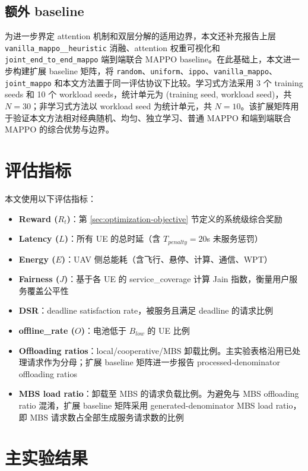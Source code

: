 \subsection{额外 baseline}

为进一步界定 attention 机制和双层分解的适用边界，本文还补充报告上层 \texttt{vanilla\_mappo\_\_heuristic} 消融、attention 权重可视化和 \texttt{joint\_end\_to\_end\_mappo} 端到端联合 MAPPO baseline。在此基础上，本文进一步构建扩展 baseline 矩阵，将 \texttt{random}、\texttt{uniform}、\texttt{ippo}、\texttt{vanilla\_mappo}、\texttt{joint\_mappo} 和本文方法置于同一评估协议下比较。学习式方法采用 3 个 training seeds 和 10 个 workload seeds，统计单元为 (training seed, workload seed)，共 $N=30$；非学习式方法以 workload seed 为统计单元，共 $N=10$。该扩展矩阵用于验证本文方法相对经典随机、均匀、独立学习、普通 MAPPO 和端到端联合 MAPPO 的综合优势与边界。

\section{评估指标}
\label{sec:metrics}

本文使用以下评估指标：

\begin{itemize}
    \item \textbf{Reward ($R_t$)}：第 \ref{sec:optimization-objective} 节定义的系统级综合奖励
    \item \textbf{Latency ($L$)}：所有 UE 的总时延（含 $T_{penalty}=20$s 未服务惩罚）
    \item \textbf{Energy ($E$)}：UAV 侧总能耗（含飞行、悬停、计算、通信、WPT）
    \item \textbf{Fairness ($J$)}：基于各 UE 的 service\_coverage 计算 Jain 指数，衡量用户服务覆盖公平性
    \item \textbf{DSR}：deadline satisfaction rate，被服务且满足 deadline 的请求比例
    \item \textbf{offline\_rate ($O$)}：电池低于 $B_{low}$ 的 UE 比例
    \item \textbf{Offloading ratios}：local/cooperative/MBS 卸载比例。主实验表格沿用已处理请求作为分母；扩展 baseline 矩阵进一步报告 processed-denominator offloading ratios
    \item \textbf{MBS load ratio}：卸载至 MBS 的请求负载比例。为避免与 MBS offloading ratio 混淆，扩展 baseline 矩阵采用 generated-denominator MBS load ratio，即 MBS 请求数占全部生成服务请求数的比例
\end{itemize}

\section{主实验结果}
\label{sec:main-results}

